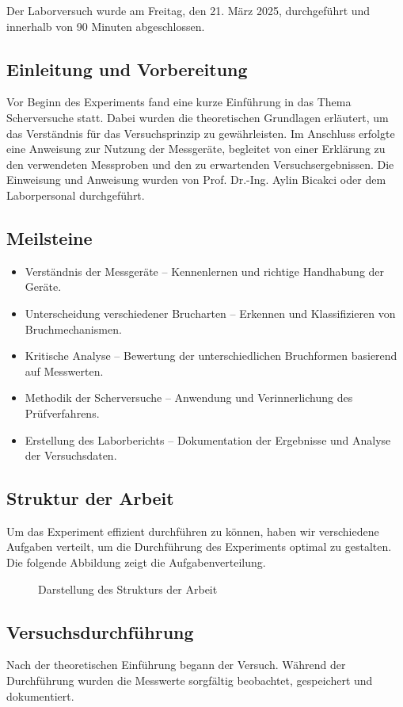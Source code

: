 Der Laborversuch wurde am Freitag, den 21. März 2025, durchgeführt und innerhalb von 90 Minuten abgeschlossen.
\subsection{Einleitung und Vorbereitung}
Vor Beginn des Experiments fand eine kurze Einführung in das Thema Scherversuche statt. Dabei wurden die theoretischen Grundlagen erläutert, um das Verständnis für das Versuchsprinzip zu gewährleisten.
Im Anschluss erfolgte eine Anweisung zur Nutzung der Messgeräte, begleitet von einer Erklärung zu den verwendeten Messproben und den zu erwartenden Versuchsergebnissen.
Die Einweisung und Anweisung wurden von Prof. Dr.-Ing. Aylin Bicakci oder dem Laborpersonal durchgeführt.
\subsection{Meilsteine}
\begin{itemize}
    \item Verständnis der Messgeräte – Kennenlernen und richtige Handhabung der Geräte.
    \item Unterscheidung verschiedener Brucharten – Erkennen und Klassifizieren von Bruchmechanismen.
    \item Kritische Analyse – Bewertung der unterschiedlichen Bruchformen basierend auf Messwerten.
    \item Methodik der Scherversuche – Anwendung und Verinnerlichung des Prüfverfahrens.
    \item Erstellung des Laborberichts – Dokumentation der Ergebnisse und Analyse der Versuchsdaten.
\end{itemize}
\subsection{Struktur der Arbeit}
Um das Experiment effizient durchführen zu können, haben wir verschiedene Aufgaben verteilt, um die Durchführung des Experiments optimal zu gestalten. Die folgende Abbildung zeigt die Aufgabenverteilung.
\begin{figure}[H]
    \centering
    \caption{Darstellung des Strukturs der Arbeit}
    \label{Abb. :Darstellung des Strukturs der Arbeit}
\end{figure}
\subsection{Versuchsdurchführung}
Nach der theoretischen Einführung begann der Versuch. Während der Durchführung wurden die Messwerte sorgfältig beobachtet, gespeichert und dokumentiert.
